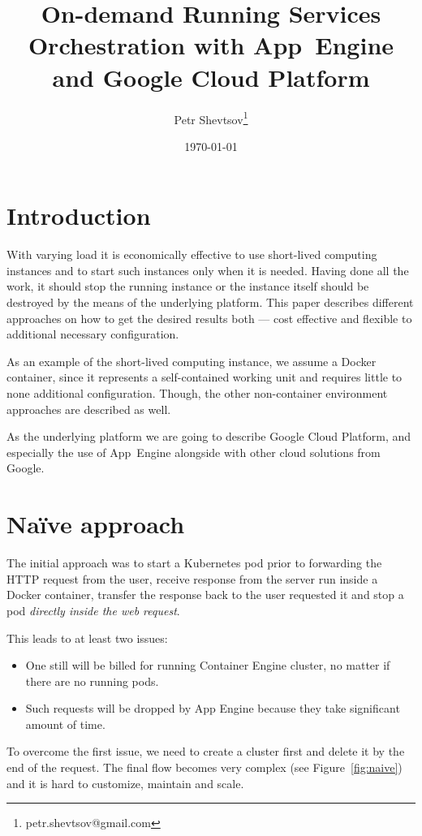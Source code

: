 \documentclass[a4paper]{article}
\title{On-demand Running Services Orchestration with App~Engine and Google Cloud
Platform}
\author{Petr Shevtsov\thanks{petr.shevtsov@gmail.com}}
\date{\today}
\begin{document}
\maketitle

\section{Introduction}
With varying load it is economically effective to use short-lived computing instances
and to start such instances only when it is needed. Having done all the work, it
should stop the running instance or the instance itself should be destroyed by the
means of the underlying platform. This paper describes different approaches on how to
get the desired results both — cost effective and flexible to additional necessary
configuration.

As an example of the short-lived computing instance, we assume a Docker container,
since it represents a self-contained working unit and requires little to none
additional configuration. Though, the other non-container environment approaches are
described as well.

As the underlying platform we are going to describe Google Cloud Platform, and
especially the use of App~Engine alongside with other cloud solutions from Google.

\section{Naïve approach}
The initial approach was to start a Kubernetes pod prior to forwarding the HTTP
request from the user, receive response from the server run inside a Docker
container, transfer the response back to the user requested it and stop a pod
\emph{directly inside the web request}.

This leads to at least two issues:
\begin{itemize}
    \item One still will be billed for running Container Engine cluster, no matter if
        there are no running pods.
    \item Such requests will be dropped by App Engine because they take significant
        amount of time.
\end{itemize}

To overcome the first issue, we need to create a cluster first and delete it by the
end of the request. The final flow becomes very complex (see Figure~\ref{fig:naive})
and it is hard to customize, maintain and scale.
\end{document}
